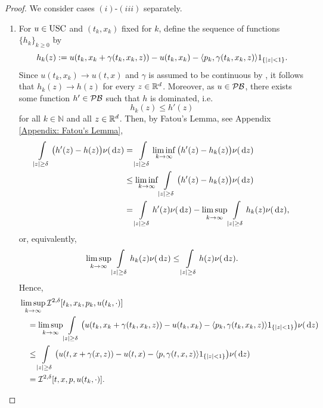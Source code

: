 \begin{proof}
    We consider cases $(i)$-$(iii)$ separately. 
    \begin{enumerate}[label=(\roman*)]
        \item For $u \in \operatorname{USC}$ and $(t_k,x_k)$ fixed for $k$, define the sequence of functions $\{h_k\}_{k \geq 0}$ by
        \begin{equation*}
            h_k(z) := u(t_k, x_k + \gamma(t_k,x_k,z)) - u(t_k,x_k) - \langle p_k, \gamma(t_k,x_k,z) \rangle 1_{\left\{|z| < 1\right\}}. 
        \end{equation*}
        Since $u(t_k,x_k) \rightarrow u(t,x)$ and $\gamma$ is assumed to be continuous by , it follows that $h_k(z) \rightarrow h(z)$ for every $z \in \mathbb{R}^d$.  Moreover, as $u \in \mathcal{PB}$, there exists some function $h' \in \mathcal{PB}$ such that $h$ is dominated, i.e.
        \begin{equation*}
            h_k(z) \leq h'(z)
        \end{equation*}
        for all $k \in \mathbb N$ and all $z \in \mathbb{R}^d$. Then, by Fatou's Lemma, see Appendix \ref{Appendix: Fatou's Lemma}, 
        \begin{align*}
            \int\limits_{|z| \geq \delta} \big( h'(z) - h(z) \big) \nu(\,\mathrm{d} z) &= \int\limits_{|z| \geq \delta} \liminf_{k \rightarrow \infty}\big( h'(z) - h_k(z) \big) \nu (\,\mathrm{d} z) \\
            & \leq \liminf_{k \rightarrow \infty} \int\limits_{|z| \geq \delta} \big( h'(z) - h_k(z) \big) \nu(\,\mathrm{d} z) \\
            &= \int\limits_{|z| \geq \delta} h'(z) \nu (\,\mathrm{d} z) - \limsup_{k \rightarrow \infty} \int\limits_{|z| \geq \delta} h_k(z) \nu (\,\mathrm{d} z),
        \end{align*}
        or, equivalently, 
        \begin{equation*}
            \limsup_{k \rightarrow \infty} \int\limits_{|z| \geq \delta} h_k(z) \nu (\,\mathrm{d} z) \leq \int\limits_{|z| \geq \delta} h(z) \nu(\,\mathrm{d} z). 
        \end{equation*}
        Hence, 
        \begin{align*}
            & \limsup_{k \rightarrow \infty}\mathcal{I}^{2,\delta}[t_k,x_k,p_k,u(t_k,\cdot)] \\
            &\quad = \limsup_{k \rightarrow \infty} \int\limits_{|z| \geq \delta} \big( u(t_k,x_k + \gamma(t_k,x_k,z)) - u(t_k,x_k) - \langle p_k, \gamma(t_k,x_k,z) \rangle 1_{\left\{|z| < 1\right\}} \big) \nu (\,\mathrm{d} z) \\
            &\quad \leq \int\limits_{|z| \geq \delta} \big( u(t,x+\gamma(x,z)) - u(t,x) - \langle p, \gamma(t,x,z) \rangle 1_{\left\{|z| < 1\right\}} \big) \nu(\,\mathrm{d} z) \\
            &\quad = \mathcal{I}^{2,\delta} [t,x,p,u(t_k,\cdot)]. 
        \end{align*}


\end{enumerate}
\end{proof}
